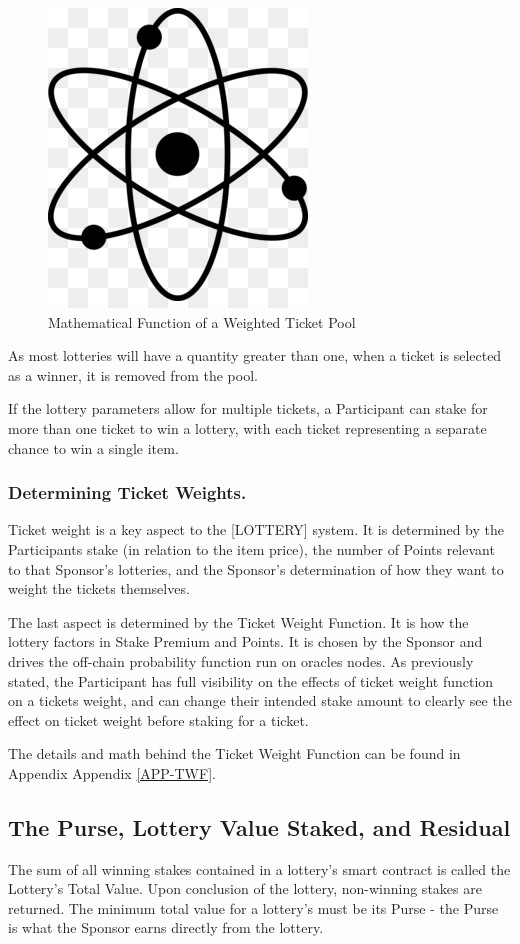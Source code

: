 \documentclass[runningheads]{llncs}
\begin{document}
\begin{figure}[H]
\centering
\includegraphics[scale=0.5]{Figures_and_Tables/atom.png}
\caption{Mathematical Function of a Weighted Ticket Pool}
\end{figure}

As most lotteries will have a quantity greater than one, when a ticket is selected as a winner, it is removed from the pool.

If the lottery parameters allow for multiple tickets, a Participant can stake for more than one ticket to win a lottery, with each ticket representing a separate chance to win a single item. 

\subsubsection{Determining Ticket Weights.} Ticket weight is a key aspect to the [LOTTERY] system.  It is determined by the Participants stake (in relation to the item price), the number of Points relevant to that Sponsor’s lotteries, and the Sponsor’s determination of how they want to weight the tickets themselves.

The last aspect is determined by the Ticket Weight Function.  It is how the lottery factors in Stake Premium and Points.  It is chosen by the Sponsor and drives the off-chain probability function run on oracles nodes.  As previously stated, the Participant has full visibility on the effects of ticket weight function on a tickets weight, and can change their intended stake amount to clearly see the effect on ticket weight before staking for a ticket.

The details and math behind the Ticket Weight Function can be found in Appendix Appendix \ref{APP-TWF}.

\subsection{The Purse, Lottery Value Staked, and Residual}\label{subsection-ThePurseLotteryValuedStaked}
The sum of all winning stakes contained in a lottery’s smart contract is called the Lottery’s Total Value.  Upon conclusion of the lottery, non-winning stakes are returned.  The minimum total value for a lottery’s must be its Purse - the Purse is what the Sponsor earns directly from the lottery.  
\end{document}
